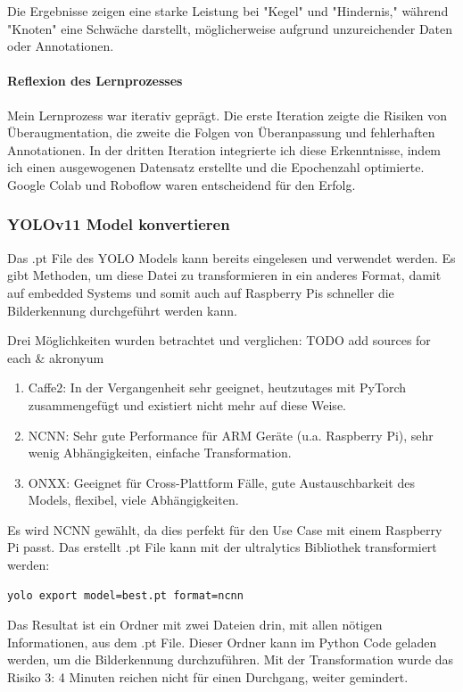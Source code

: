 Die Ergebnisse zeigen eine starke Leistung bei "Kegel" und "Hindernis," während "Knoten" eine Schwäche darstellt, möglicherweise aufgrund unzureichender Daten oder Annotationen.

\paragraph{Reflexion des Lernprozesses}

Mein Lernprozess war iterativ geprägt. Die erste Iteration zeigte die Risiken von Überaugmentation, die zweite die Folgen von Überanpassung und fehlerhaften Annotationen. In der dritten Iteration integrierte ich diese Erkenntnisse, indem ich einen ausgewogenen Datensatz erstellte und die Epochenzahl optimierte. Google Colab und Roboflow waren entscheidend für den Erfolg.


\subsubsection{YOLOv11 Model konvertieren}
\label{convert-yolo}

Das .pt File des YOLO Models kann bereits eingelesen und verwendet werden. Es gibt Methoden, um diese Datei zu transformieren in ein anderes Format, damit auf embedded Systems und somit auch auf Raspberry Pis schneller die Bilderkennung durchgeführt werden kann.

Drei Möglichkeiten wurden betrachtet und verglichen:
TODO add sources for each \& akronyum
\begin{enumerate}
    \item Caffe2: In der Vergangenheit sehr geeignet, heutzutages mit PyTorch zusammengefügt und existiert nicht mehr auf diese Weise.
    \item NCNN: Sehr gute Performance für ARM Geräte (u.a. Raspberry Pi), sehr wenig Abhängigkeiten, einfache Transformation.
    \item ONXX: Geeignet für  Cross-Plattform Fälle, gute Austauschbarkeit des Models, flexibel, viele Abhängigkeiten.
\end{enumerate}

Es wird NCNN gewählt, da dies perfekt für den Use Case mit einem Raspberry Pi passt. Das erstellt .pt File kann mit der ultralytics Bibliothek transformiert werden:

\begin{verbatim}
yolo export model=best.pt format=ncnn
\end{verbatim}

Das Resultat ist ein Ordner mit zwei Dateien drin, mit allen nötigen Informationen, aus dem .pt File. Dieser Ordner kann im Python Code geladen werden, um die Bilderkennung durchzuführen. Mit der Transformation wurde das Risiko 3: 4 Minuten reichen nicht für einen Durchgang, weiter gemindert.

